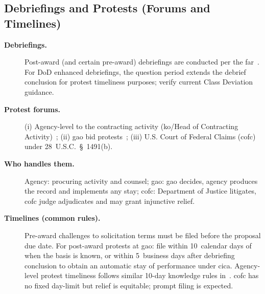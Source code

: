 \documentclass[../main.tex]{subfiles}
\begin{document}
\subsection{Debriefings and Protests (Forums and Timelines)}
\begin{description}
  \item[\textbf{Debriefings.}] Post-award (and certain pre-award) debriefings are conducted per the \ac{far}~\autocite[\S~15.506]{FAR}. For DoD enhanced debriefings, the question period extends the debrief conclusion for protest timeliness purposes; verify current Class Deviation guidance.
  \item[\textbf{Protest forums.}] (i) Agency-level to the contracting activity (\ac{ko}/Head of Contracting Activity)~\autocite[\S~33.103]{FAR}; (ii) \ac{gao} bid protests~\autocite[\S~33.104]{FAR}; (iii) U.S. Court of Federal Claims (\ac{cofc}) under 28~U.S.C.~\S~1491(b).
  \item[\textbf{Who handles them.}] Agency: procuring activity and counsel; \ac{gao}: \ac{gao} decides, agency produces the record and implements any stay; \ac{cofc}: Department of Justice litigates, \ac{cofc} judge adjudicates and may grant injunctive relief.
  \item[\textbf{Timelines (common rules).}] Pre-award challenges to solicitation terms must be filed before the proposal due date. For post-award protests at \ac{gao}: file within 10~calendar days of when the basis is known, or within 5~business days after debriefing conclusion to obtain an automatic stay of performance under \ac{cica}. Agency-level protest timeliness follows similar 10-day knowledge rules in~\autocite[\S~33.103]{FAR}. \ac{cofc} has no fixed day-limit but relief is equitable; prompt filing is expected.
\end{description}
\end{document}
